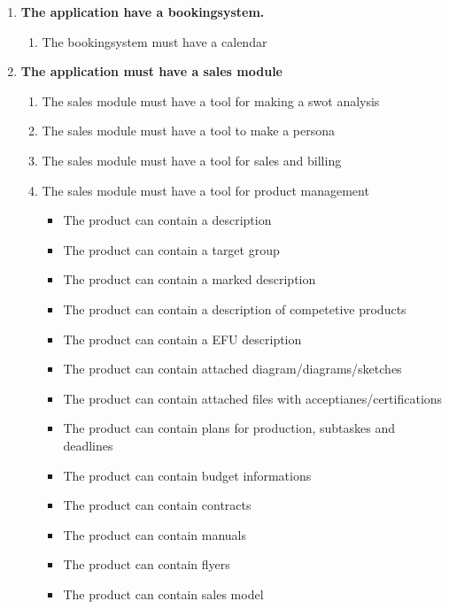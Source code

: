 \begin{enumerate}
\begin{enumerate}
\begin{enumerate}
            \item \textbf{The application have a bookingsystem.}
            \begin{enumerate}
                \item The bookingsystem must have a calendar
            \end{enumerate}
            \item \textbf{The application must have a sales module}
            \begin{enumerate}
                \item The sales module must have a tool for making a swot analysis
                \item The sales module must have a tool to make a persona
                \item The sales module must have a tool for sales and billing
                \item The sales module must have a tool for product management
                \begin{itemize}
                    \item The product can contain a description
                    \item The product can contain a target group
                    \item The product can contain a marked description
                    \item The product can contain a description of competetive products
                    \item The product can contain a EFU description
                    \item The product can contain attached diagram/diagrams/sketches
                    \item The product can contain attached files with acceptianes/certifications
                    \item The product can contain plans for production, subtaskes and deadlines
                    \item The product can contain budget informations
                    \item The product can contain contracts
                    \item The product can contain manuals
                    \item The product can contain flyers
                    \item The product can contain sales model
                \end{itemize}
            \end{enumerate}

\end{enumerate}
\end{enumerate}
\end{enumerate}
